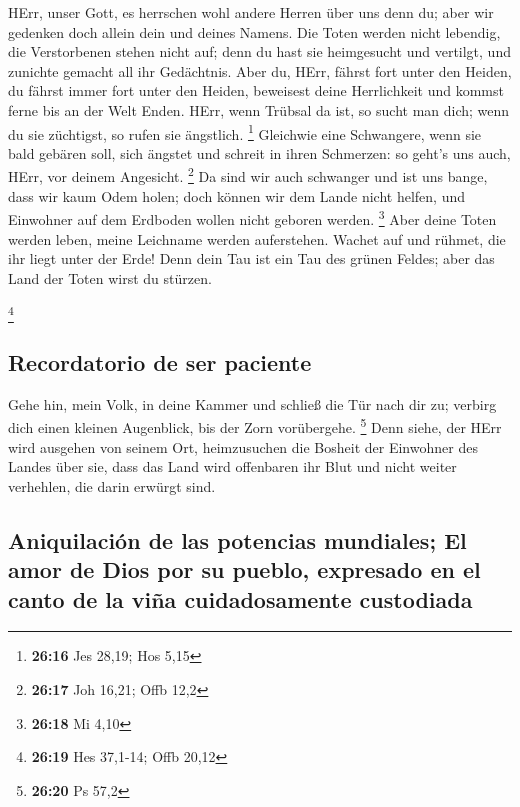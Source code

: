  HErr, unser Gott, es herrschen wohl andere Herren über
uns denn du; aber wir gedenken doch allein dein und deines Namens.
 Die Toten werden nicht lebendig, die Verstorbenen stehen
nicht auf; denn du hast sie heimgesucht und vertilgt, und zunichte
gemacht all ihr Gedächtnis.  Aber du, HErr, fährst fort
unter den Heiden, du fährst immer fort unter den Heiden, beweisest deine
Herrlichkeit und kommst ferne bis an der Welt Enden. 
HErr, wenn Trübsal da ist, so sucht man dich; wenn du sie züchtigst, so
rufen sie ängstlich. \footnote{\textbf{26:16} Jes 28,19; Hos 5,15}
 Gleichwie eine Schwangere, wenn sie bald gebären soll,
sich ängstet und schreit in ihren Schmerzen: so geht's uns auch, HErr,
vor deinem Angesicht. \footnote{\textbf{26:17} Joh 16,21; Offb 12,2}
 Da sind wir auch schwanger und ist uns bange, dass wir
kaum Odem holen; doch können wir dem Lande nicht helfen, und Einwohner
auf dem Erdboden wollen nicht geboren werden. \footnote{\textbf{26:18}
  Mi 4,10}  Aber deine Toten werden leben, meine
Leichname werden auferstehen. Wachet auf und rühmet, die ihr liegt unter
der Erde! Denn dein Tau ist ein Tau des grünen Feldes; aber das Land der
Toten wirst du stürzen.

\footnote{\textbf{26:19} Hes 37,1-14; Offb 20,12}

\hypertarget{recordatorio-de-ser-paciente}{%
\subsection{Recordatorio de ser
paciente}\label{recordatorio-de-ser-paciente}}

 Gehe hin, mein Volk, in deine Kammer und schließ die Tür
nach dir zu; verbirg dich einen kleinen Augenblick, bis der Zorn
vorübergehe. \footnote{\textbf{26:20} Ps 57,2}  Denn
siehe, der HErr wird ausgehen von seinem Ort, heimzusuchen die Bosheit
der Einwohner des Landes über sie, dass das Land wird offenbaren ihr
Blut und nicht weiter verhehlen, die darin erwürgt sind.

\hypertarget{aniquilaciuxf3n-de-las-potencias-mundiales-el-amor-de-dios-por-su-pueblo-expresado-en-el-canto-de-la-viuxf1a-cuidadosamente-custodiada}{%
\subsection{Aniquilación de las potencias mundiales; El amor de Dios por
su pueblo, expresado en el canto de la viña cuidadosamente
custodiada}\label{aniquilaciuxf3n-de-las-potencias-mundiales-el-amor-de-dios-por-su-pueblo-expresado-en-el-canto-de-la-viuxf1a-cuidadosamente-custodiada}}

